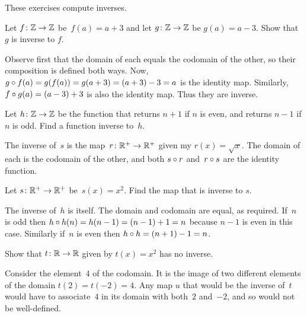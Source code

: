 \documentclass{ibl}  %
\begin{document}
\begin{problem} 
These exercises compute inverses.
\begin{exes}
\begin{exercise} 
  Let $\mbox{$f\colon \mathbb{Z}\to \mathbb{Z}$}$ be~$f(a)=a+3$ and let
  $\mbox{$g\colon \mathbb{Z}\to \mathbb{Z}$}$ be $g(a)=a-3$.
  Show that $g$ is inverse to $f$.
\end{exercise}
\begin{answer}
  Observe first that the domain of each equals the codomain of the other,
  so their composition is defined both ways.
  Now, $g\mathbin{\circ} f(a)=g(f(a))=g(a+3)=(a+3)-3=a$
  is the identity map.
  Similarly, $f\mathbin{\circ} g(a)=(a-3)+3$ is also the identity map.
  Thus they are inverse.  
\end{answer}
\begin{exercise} 
  Let $\mbox{$h\colon \mathbb{Z}\to \mathbb{Z}$}$ be the function that returns
  $n+1$ if $n$ is even, and returns $n-1$ if $n$ is odd.
  Find a function inverse to~$h$.
\end{exercise}
\begin{answer}
  The inverse of~$s$ is the map~$\mbox{$r\colon \mathbb{R}^+\to \mathbb{R}^+$}$ given my 
  $r(x)=\sqrt{x}$.
  The domain of each is the codomain of the other,
  and both $s\mathbin{\circ} r$ and~$r\mathbin{\circ} s$ are the identity function.  
\end{answer}
\begin{exercise}[\maxlength] 
  Let $\mbox{$s\colon \mathbb{R}^+\to \mathbb{R}^+$}$ be~$s(x)=x^2$.
  Find the map that is inverse to $s$.
\end{exercise}
\begin{answer}
  The inverse of~$h$ is itself.
  The domain and codomain are equal, as required. 
  If~$n$ is odd then $h\mathbin{\circ} h(n)=h(n-1)=(n-1)+1=n$ because 
  $n-1$ is even in this case.
  Similarly if~$n$ is even then $h\mathbin{\circ} h=(n+1)-1=n$.  
\end{answer}
\begin{exercise} 
  Show that $\mbox{$t\colon \mathbb{R}\to \mathbb{R}$}$ given by $t(x)=x^2$
  has no inverse.
\end{exercise}
\begin{answer}
  Consider the element~$4$ of the codomain.
  It is the image of two different elements of the domain
  $t(2)=t(-2)=4$. 
  Any map $u$ that would be the inverse of~$t$ would have to associate~$4$ 
  in its domain with both~$2$ and~$-2$, and so would not be well-defined.  
\end{answer}
\end{exes}

\end{problem}
\end{document}
